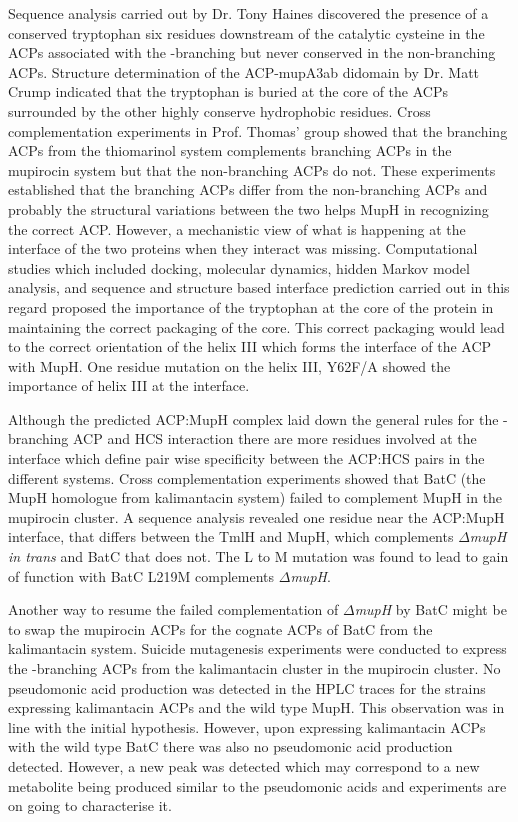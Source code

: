 	Sequence analysis carried out by Dr. Tony Haines discovered the presence of a conserved tryptophan six residues downstream of the catalytic cysteine in the ACPs associated with the \bet-branching but never conserved in the non-branching ACPs. Structure determination of the ACP-mupA3ab didomain by Dr. Matt Crump indicated that the tryptophan is buried at the core of the ACPs surrounded by the other highly conserve hydrophobic residues. Cross complementation experiments in Prof. Thomas' group showed that the branching ACPs from the thiomarinol system complements branching ACPs in the mupirocin system but that the non-branching ACPs do not. These experiments established that the branching ACPs differ from the non-branching ACPs and probably the structural variations between the two helps MupH in recognizing the correct ACP. However, a mechanistic view of what is happening at the interface of the two proteins when they interact was missing. Computational studies which included docking, molecular dynamics, hidden Markov model analysis, and sequence and structure based interface prediction carried out in this regard proposed the importance of the tryptophan at the core of the protein in maintaining the correct packaging of the core. This correct packaging would lead to the correct orientation of the helix III which forms the interface of the ACP with MupH. One residue mutation on the helix III, Y62F/A showed the importance of helix III at the interface. 
	
	Although the predicted ACP:MupH complex laid down the general rules for the \bet-branching ACP and HCS interaction there are more residues involved at the interface which define pair wise specificity between the ACP:HCS pairs in the different systems. Cross complementation experiments showed that BatC (the MupH homologue from kalimantacin system) failed to complement MupH in the mupirocin cluster. A sequence analysis revealed one residue near the ACP:MupH interface, that differs between the TmlH and MupH, which complements $ \Delta $\textit{mupH} \textit{in trans} and BatC that does not. The L to M mutation was found to lead to gain of function with BatC L219M complements $ \Delta $\textit{mupH}.
	
	Another way to resume the failed complementation of  $ \Delta $\textit{mupH} by BatC might be to swap the mupirocin ACPs for the cognate ACPs of BatC from the kalimantacin system. Suicide mutagenesis experiments were conducted to express the \bet-branching ACPs from the kalimantacin cluster in the mupirocin cluster. No pseudomonic acid production was detected in the HPLC traces for the strains expressing kalimantacin ACPs and the wild type MupH. This observation was in line with the initial hypothesis. However, upon expressing kalimantacin ACPs with the wild type BatC there was also no pseudomonic acid production detected. However, a new peak was detected which may correspond to a new metabolite being produced similar to the pseudomonic acids and experiments are on going to characterise it. 
	
